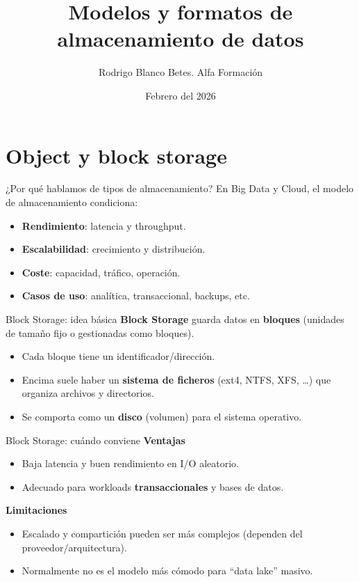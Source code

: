 \documentclass{beamer}
\title{Modelos y formatos de almacenamiento de datos}
\author{Rodrigo Blanco Betes. Alfa Formación}
\date{Febrero del 2026}
\begin{document}
\begin{frame}
\titlepage
\end{frame}

\begin{frame}
\tableofcontents
\end{frame}



\section{Object y block storage}

\begin{frame}{¿Por qué hablamos de tipos de almacenamiento?}
En Big Data y Cloud, el modelo de almacenamiento condiciona:
\begin{itemize}
    \item \textbf{Rendimiento}: latencia y throughput.
    \item \textbf{Escalabilidad}: crecimiento y distribución.
    \item \textbf{Coste}: capacidad, tráfico, operación.
    \item \textbf{Casos de uso}: analítica, transaccional, backups, etc.
\end{itemize}
\end{frame}

\begin{frame}{Block Storage: idea básica}
\textbf{Block Storage} guarda datos en \textbf{bloques} (unidades de tamaño fijo o gestionadas como bloques).
\begin{itemize}
    \item Cada bloque tiene un identificador/dirección.
    \item Encima suele haber un \textbf{sistema de ficheros} (ext4, NTFS, XFS, \dots) que organiza archivos y directorios.
    \item Se comporta como un \textbf{disco} (volumen) para el sistema operativo.
\end{itemize}
\end{frame}

\begin{frame}{Block Storage: cuándo conviene}
\textbf{Ventajas}
\begin{itemize}
    \item Baja latencia y buen rendimiento en I/O aleatorio.
    \item Adecuado para workloads \textbf{transaccionales} y bases de datos.
\end{itemize}

\textbf{Limitaciones}
\begin{itemize}
    \item Escalado y compartición pueden ser más complejos (dependen del proveedor/arquitectura).
    \item Normalmente no es el modelo más cómodo para “data lake” masivo.
\end{itemize}
\end{frame}
\end{document}

